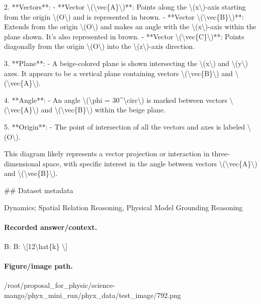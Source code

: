2. **Vectors**:
   - **Vector \textbackslash{}(\textbackslash{}vec\{A\}\textbackslash{})**: Points along the \textbackslash{}(x\textbackslash{})-axis starting from the origin \textbackslash{}(O\textbackslash{}) and is represented in brown.
   - **Vector \textbackslash{}(\textbackslash{}vec\{B\}\textbackslash{})**: Extends from the origin \textbackslash{}(O\textbackslash{}) and makes an angle with the \textbackslash{}(x\textbackslash{})-axis within the plane shown. It’s also represented in brown.
   - **Vector \textbackslash{}(\textbackslash{}vec\{C\}\textbackslash{})**: Points diagonally from the origin \textbackslash{}(O\textbackslash{}) into the \textbackslash{}(z\textbackslash{})-axis direction.

3. **Plane**:
   - A beige-colored plane is shown intersecting the \textbackslash{}(x\textbackslash{}) and \textbackslash{}(y\textbackslash{}) axes. It appears to be a vertical plane containing vectors \textbackslash{}(\textbackslash{}vec\{B\}\textbackslash{}) and \textbackslash{}(\textbackslash{}vec\{A\}\textbackslash{}).

4. **Angle**:
   - An angle \textbackslash{}(\textbackslash{}phi = 30\textasciicircum{}\textbackslash{}circ\textbackslash{}) is marked between vectors \textbackslash{}(\textbackslash{}vec\{A\}\textbackslash{}) and \textbackslash{}(\textbackslash{}vec\{B\}\textbackslash{}) within the beige plane. 

5. **Origin**:
   - The point of intersection of all the vectors and axes is labeled \textbackslash{}(O\textbackslash{}).

This diagram likely represents a vector projection or interaction in three-dimensional space, with specific interest in the angle between vectors \textbackslash{}(\textbackslash{}vec\{A\}\textbackslash{}) and \textbackslash{}(\textbackslash{}vec\{B\}\textbackslash{}).

\#\# Dataset metadata

Dynamics; Spatial Relation Reasoning, Physical Model Grounding Reasoning

\paragraph{Recorded answer/context.}
B: B: \textbackslash{}[12\textbackslash{}hat\{k\} \textbackslash{}]

\paragraph{Figure/image path.}
/root/proposal\_for\_physic/science-mango/phyx\_mini\_run/phyx\_data/test\_image/792.png

